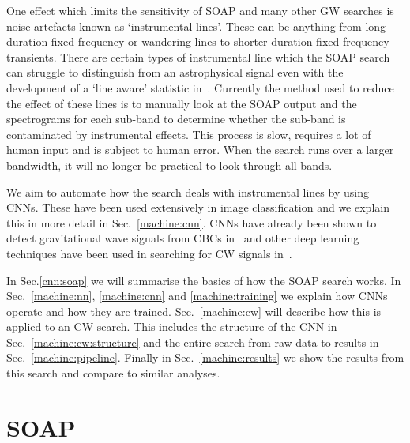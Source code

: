 %

One effect which limits the sensitivity of SOAP and many other
\gls{GW} searches is noise artefacts known as `instrumental lines'. These can be anything
from long duration fixed frequency or wandering lines to shorter duration fixed frequency transients. 
There are certain types of instrumental line which the SOAP search can struggle to distinguish from an astrophysical signal even with the development of a
`line aware' statistic in~\cite{bayley2019SOAPGeneralised}. Currently the
method used to reduce the effect of these lines is to manually look at the SOAP
output and the spectrograms for each sub-band to determine whether the sub-band
is contaminated by instrumental effects. This process is slow, requires a
lot of human input and is subject to human error. When the search runs over
a larger bandwidth, it will no longer be practical to look
through all bands. 

%

We aim to automate how the search deals with instrumental lines by using \glspl{CNN}.
These have been used extensively in image classification and we explain this in
more detail in Sec.~\ref{machine:cnn}. \glspl{CNN}
have already been shown to detect gravitational wave signals from \glspl{CBC}
in~\cite{gabbard2018MatchingMatched,george2018DeepLearning,gebhard2019ConvolutionalNeural}
and other deep learning techniques have been used in searching for \gls{CW}
signals in~\cite{dreissigacker2019DeeplearningContinuous}. 

%
In Sec.\ref{cnn:soap} we will summarise the basics of how the SOAP search works. In
Sec.~\ref{machine:nn}, \ref{machine:cnn} and \ref{machine:training} we explain how \glspl{CNN} operate and how they are trained. Sec.~\ref{machine:cw} will describe how this is applied to an \gls{CW} search. 
This includes the structure of the \gls{CNN} in Sec.~\ref{machine:cw:structure} and the entire search from raw data to results in Sec.~\ref{machine:pipeline}. Finally in Sec.~\ref{machine:results} we
show the results from this search and compare to similar analyses. 

\section{\label{cnn:soap} SOAP}

